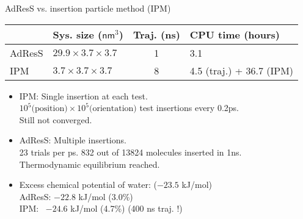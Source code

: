 \documentclass[]{beamer}
\newcommand{\redc}[1]{{\color{red} #1}}
\begin{document}
\begin{frame}{AdResS vs. insertion particle method (IPM)}
  \vfill
    \centering
    \begin{tabular}{l|l|c|l}
      & Sys. size ($\textsf{nm}^3$)
      & Traj. (\textsf{ns})
      & CPU time (hours)\\    \hline
      AdResS   &$29.9\times3.7\times3.7$ & 1 & 3.1\\
      IPM & $3.7\times3.7\times3.7$ & 8 & 4.5 (traj.) + 36.7 (IPM)\\
    \end{tabular}
  
  \vfill
  \begin{itemize}
  \item<1-> IPM: \redc{Single insertion} at each test.\\
    $10^5 \textrm{(position)} \times 10^5 \textrm{(orientation)}$ test insertions every 0.2ps.\\
    Still not converged.
    \vfill
  \item<1-> AdResS: \redc{Multiple insertions}.\\
    23 trials per ps. 832 out of 13824 molecules inserted in 1ns.\\
    Thermodynamic equilibrium reached.
    \vfill
  \item<2-> Excess chemical potential of water: ($-23.5$ kJ/mol)\\
    AdResS: $-22.8$ kJ/mol (3.0\%)\\
    IPM: \ \quad$-24.6$ kJ/mol (4.7\%) (400 ns traj. !)
  \end{itemize}
\end{frame}
\end{document}
